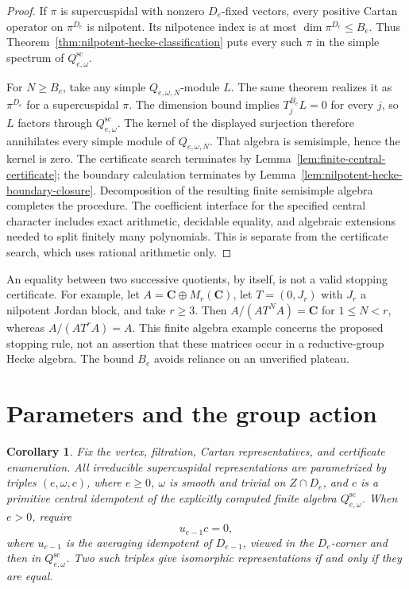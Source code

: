 \documentclass[10pt,letterpaper]{amsart}
\numberwithin{equation}{section}
\newtheorem{corollary}[theorem]{Corollary}
\theoremstyle{remark}
\begin{document}
\begin{proof}
If $\pi$ is supercuspidal with nonzero $D_e$-fixed vectors, every positive
Cartan operator on $\pi^{D_e}$ is nilpotent. Its nilpotence index is at
most $\dim\pi^{D_e}\le B_e$. Thus Theorem~\ref{thm:nilpotent-hecke-classification} puts every such $\pi$
in the simple spectrum of $Q^{\mathrm{sc}}_{e,\omega}$.

For $N\ge B_e$, take any simple $Q_{e,\omega,N}$-module $L$.
The same theorem realizes it as $\pi^{D_e}$ for a supercuspidal $\pi$.
The dimension bound implies $T_j^{B_e}L=0$ for every $j$, so $L$
factors through $Q^{\mathrm{sc}}_{e,\omega}$. The kernel of the
displayed surjection therefore annihilates every simple module of
$Q_{e,\omega,N}$. That algebra is semisimple, hence the kernel is zero.
The certificate search terminates by
Lemma~\ref{lem:finite-central-certificate}; the boundary calculation
terminates by Lemma~\ref{lem:nilpotent-hecke-boundary-closure}.
Decomposition of the resulting finite semisimple algebra completes the
procedure. The coefficient interface for the specified central character
includes exact arithmetic, decidable equality, and algebraic extensions
needed to split finitely many polynomials. This is separate from the
certificate search, which uses rational arithmetic only.
\end{proof}

An equality between two successive quotients, by itself, is not a valid
stopping certificate. For example, let $A=\mathbf C\oplus M_r(\mathbf C)$,
let $T=(0,J_r)$ with $J_r$ a nilpotent Jordan block, and take $r\ge3$.
Then $A/(AT^NA)=\mathbf C$ for $1\le N<r$, whereas $A/(AT^rA)=A$.
This finite algebra example concerns the proposed stopping rule, not an
assertion that these matrices occur in a reductive-group Hecke algebra.
The bound $B_e$ avoids reliance on an unverified plateau.


\section{Parameters and the group action}
\label{sec:matrix-data}

\begin{corollary}\label{cor:certified-complete-algebra-data}
Fix the vertex, filtration, Cartan representatives, and certificate
enumeration. All irreducible supercuspidal representations are parametrized
by triples $(e,\omega,c)$, where $e\ge0$, $\omega$ is smooth and trivial
on $Z\cap D_e$, and $c$ is a primitive central idempotent of the
explicitly computed finite algebra $Q^{\mathrm{sc}}_{e,\omega}$.
When $e>0$, require
\[
 u_{e-1}c=0,
\]
where $u_{e-1}$ is the averaging idempotent of $D_{e-1}$, viewed in the
$D_e$-corner and then in $Q^{\mathrm{sc}}_{e,\omega}$.
Two such triples give isomorphic representations if and only if they
are equal.
\end{corollary}
\end{document}
